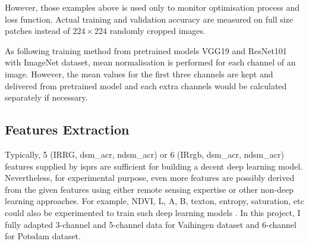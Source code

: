 However, those examples above is used only to monitor optimisation process and
loss function. Actual training and validation accuracy are measured on full size
patches instead of $224 \times 224$  randomly cropped images.


As following training method from pretrained models VGG19 and ResNet101 with
ImageNet dataset, mean normalisation is performed for each channel of an image.
However, the mean values for the first three channels are kept and delivered
from pretrained model \cite{matconvnet_vgg19, matconvnet_resnet101} and each
extra channels would be calculated separately if necessary.

\subsection{Features Extraction}
Typically, 5 (IRRG, \acrshort{dsm_acr}, n\acrshort{dsm_acr}) or 6
(IR\acrshort{rgb}, \acrshort{dsm_acr}, n\acrshort{dsm_acr}) features supplied
by \acrshort{isprs} are sufficient for building a decent deep learning
model. Nevertheless, for experimental purpose, even more features are possibly
derived from the given features using either remote sensing expertise or other
non-deep learning approaches. For example, NDVI, L, A, B, texton, entropy,
saturation, etc could also be experimented to train such deep learning models
\cite{quang2015efficient, duytv-2017}. In this project, I fully adapted
3-channel and 5-channel data for Vaihingen dataset and 6-channel for Potsdam
dataset.
